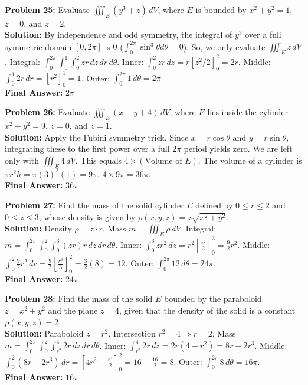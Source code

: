 \documentclass[12pt]{article}
\begin{document}
\textbf{Problem 25:} Evaluate $\iiint_E (y^3 + z) \, dV$, where $E$ is bounded by $x^2+y^2=1$, $z=0$, and $z=2$.
\\
\textbf{Solution:} By independence and odd symmetry, the integral of $y^3$ over a full symmetric domain $[0, 2\pi]$ is $0$ ($\int_0^{2\pi} \sin^3\theta d\theta = 0$). So, we only evaluate $\iiint_E z \, dV$.
Integral: $\int_0^{2\pi} \int_0^1 \int_0^2 z r \, dz \, dr \, d\theta$.
Inner: $\int_0^2 zr \, dz = r[z^2/2]_0^2 = 2r$.
Middle: $\int_0^1 2r \, dr = [r^2]_0^1 = 1$.
Outer: $\int_0^{2\pi} 1 \, d\theta = 2\pi$.
\\
\textbf{Final Answer:} $2\pi$
\vspace{0.5cm}

\textbf{Problem 26:} Evaluate $\iiint_E (x - y + 4) \, dV$, where $E$ lies inside the cylinder $x^2+y^2=9$, $z=0$, and $z=1$.
\\
\textbf{Solution:} Apply the Fubini symmetry trick. Since $x = r\cos\theta$ and $y = r\sin\theta$, integrating these to the first power over a full $2\pi$ period yields zero. We are left only with $\iiint_E 4 \, dV$.
This equals $4 \times (\text{Volume of } E)$.
The volume of a cylinder is $\pi r^2 h = \pi (3)^2 (1) = 9\pi$.
$4 \times 9\pi = 36\pi$.
\\
\textbf{Final Answer:} $36\pi$
\vspace{0.5cm}

\textbf{Problem 27:} Find the mass of the solid cylinder $E$ defined by $0 \le r \le 2$ and $0 \le z \le 3$, whose density is given by $\rho(x,y,z) = z\sqrt{x^2+y^2}$.
\\
\textbf{Solution:} Density $\rho = z \cdot r$. Mass $m = \iiint_E \rho \, dV$.
Integral: $m = \int_0^{2\pi} \int_0^2 \int_0^3 (zr) r \, dz \, dr \, d\theta$.
Inner: $\int_0^3 z r^2 \, dz = r^2\left[\frac{z^2}{2}\right]_0^3 = \frac{9}{2}r^2$.
Middle: $\int_0^2 \frac{9}{2}r^2 \, dr = \frac{9}{2}\left[\frac{r^3}{3}\right]_0^2 = \frac{3}{2}(8) = 12$.
Outer: $\int_0^{2\pi} 12 \, d\theta = 24\pi$.
\\
\textbf{Final Answer:} $24\pi$
\vspace{0.5cm}

\textbf{Problem 28:} Find the mass of the solid $E$ bounded by the paraboloid $z = x^2+y^2$ and the plane $z=4$, given that the density of the solid is a constant $\rho(x,y,z) = 2$.
\\
\textbf{Solution:} Paraboloid $z=r^2$. Intersection $r^2=4 \Rightarrow r=2$.
Mass $m = \int_0^{2\pi} \int_0^2 \int_{r^2}^4 2 r \, dz \, dr \, d\theta$.
Inner: $\int_{r^2}^4 2r \, dz = 2r(4 - r^2) = 8r - 2r^3$.
Middle: $\int_0^2 (8r - 2r^3) \, dr = \left[ 4r^2 - \frac{r^4}{2} \right]_0^2 = 16 - \frac{16}{2} = 8$.
Outer: $\int_0^{2\pi} 8 \, d\theta = 16\pi$.
\\
\textbf{Final Answer:} $16\pi$
\vspace{0.5cm}
\end{document}
